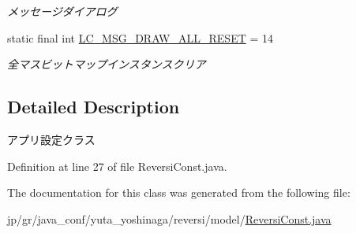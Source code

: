 \begin{DoxyCompactItemize}
\begin{DoxyCompactList}\small\item\em メッセージダイアログ \end{DoxyCompactList}\item 
\mbox{\label{classjp_1_1gr_1_1java__conf_1_1yuta__yoshinaga_1_1reversi_1_1model_1_1_reversi_const_a9b8cbe7b567984747ec216658c1823e3}} 
static final int \hyperlink{classjp_1_1gr_1_1java__conf_1_1yuta__yoshinaga_1_1reversi_1_1model_1_1_reversi_const_a9b8cbe7b567984747ec216658c1823e3}{L\+C\+\_\+\+M\+S\+G\+\_\+\+D\+R\+A\+W\+\_\+\+A\+L\+L\+\_\+\+R\+E\+S\+ET} = 14
\begin{DoxyCompactList}\small\item\em 全マスビットマップインスタンスクリア \end{DoxyCompactList}\end{DoxyCompactItemize}


\subsection{Detailed Description}
アプリ設定クラス 

Definition at line 27 of file Reversi\+Const.\+java.



The documentation for this class was generated from the following file\+:\begin{DoxyCompactItemize}
\item 
jp/gr/java\+\_\+conf/yuta\+\_\+yoshinaga/reversi/model/\hyperlink{_reversi_const_8java}{Reversi\+Const.\+java}\end{DoxyCompactItemize}
